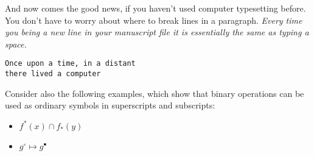 \documentclass[11pt,letterpaper]{article}
\begin{document}
\sloppypar
And now comes the good news, if you haven't used
computer typesetting before. You don't have to worry about where to
break lines in a paragraph.
\textit{Every time you being a new line in your manuscript file 
it is essentially the same as typing a space.}

\begin{verbatim}
Once upon a time, in a distant
there lived a computer
\end{verbatim}

Consider also the following examples, which show that binary operations
can be used as ordinary symbols in superscripts and subscripts:

\begin{itemize}
\item $f^*(x) \cap f_*(y)$
\item $g^\circ \mapsto g^\bullet$
\end{itemize}
\end{document}
